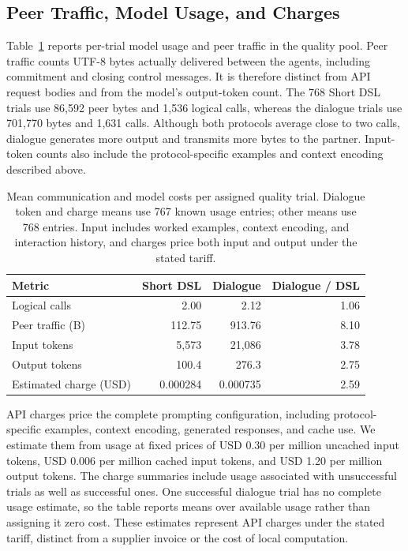 \documentclass[sigconf,nonacm,balance=false]{aamas}
\newcommand{\tabstyle}{\small\setlength{\tabcolsep}{3pt}\renewcommand{\arraystretch}{1.10}}
\begin{document}
\subsection{Peer Traffic, Model Usage, and Charges}
Table~\ref{tab:prompted-usage-complete} reports per-trial model usage and peer traffic in the quality pool. Peer traffic counts UTF-8 bytes actually delivered between the agents, including commitment and closing control messages. It is therefore distinct from API request bodies and from the model's output-token count. The 768 Short DSL trials use 86,592 peer bytes and 1,536 logical calls, whereas the dialogue trials use 701,770 bytes and 1,631 calls. Although both protocols average close to two calls, dialogue generates more output and transmits more bytes to the partner. Input-token counts also include the protocol-specific examples and context encoding described above.

\begin{table}[!htbp]
\centering\tabstyle
\caption{Mean communication and model costs per assigned quality trial. Dialogue token and charge means use 767 known usage entries; other means use 768 entries. Input includes worked examples, context encoding, and interaction history, and charges price both input and output under the stated tariff.}
\label{tab:prompted-usage-complete}
\begin{tabular}{@{}lrrr@{}}\toprule
Metric & Short DSL & Dialogue & Dialogue / DSL\\\midrule
Logical calls & 2.00 & 2.12 & 1.06\\
Peer traffic (B) & 112.75 & 913.76 & 8.10\\
Input tokens & 5,573 & 21,086 & 3.78\\
Output tokens & 100.4 & 276.3 & 2.75\\
Estimated charge (USD) & 0.000284 & 0.000735 & 2.59\\\bottomrule
\end{tabular}
\end{table}

API charges price the complete prompting configuration, including protocol-specific examples, context encoding, generated responses, and cache use. We estimate them from usage at fixed prices of USD 0.30 per million uncached input tokens, USD 0.006 per million cached input tokens, and USD 1.20 per million output tokens. The charge summaries include usage associated with unsuccessful trials as well as successful ones. One successful dialogue trial has no complete usage estimate, so the table reports means over available usage rather than assigning it zero cost. These estimates represent API charges under the stated tariff, distinct from a supplier invoice or the cost of local computation.
\end{document}
